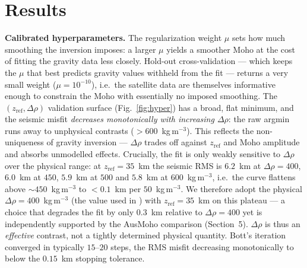 \documentclass[extra,mreferee]{gji}
\begin{document}
\section{Results}
\textbf{Calibrated hyperparameters.} The regularization weight $\mu$ sets how much
smoothing the inversion imposes: a larger $\mu$ yields a smoother Moho at the cost
of fitting the gravity data less closely. Hold-out cross-validation --- which keeps
the $\mu$ that best predicts gravity values withheld from the fit --- returns a very
small weight ($\mu=10^{-10}$), i.e.\ the satellite data are themselves informative
enough to constrain the Moho with essentially no imposed smoothing. The
$(z_{\mathrm{ref}},\Delta\rho)$ validation
surface (Fig.~\ref{fig:hyper}) has a broad, flat minimum, and the seismic misfit
\emph{decreases monotonically with increasing $\Delta\rho$}: the raw argmin runs
away to unphysical contrasts ($>600$~kg\,m$^{-3}$). This reflects the
non-uniqueness of gravity inversion --- $\Delta\rho$ trades off against
$z_{\mathrm{ref}}$ and Moho amplitude and absorbs unmodelled effects. Crucially,
the fit is only weakly sensitive to $\Delta\rho$ over the physical range: at
$z_{\mathrm{ref}}=35$~km the seismic RMS is $6.2$~km at $\Delta\rho=400$,
$6.0$~km at $450$, $5.9$~km at $500$ and $5.8$~km at $600$~kg\,m$^{-3}$, i.e.\ the
curve flattens above $\sim450$~kg\,m$^{-3}$ to $<0.1$~km per $50$~kg\,m$^{-3}$. We
therefore adopt the physical $\Delta\rho=400$~kg\,m$^{-3}$ (the value used
in \citealt{uieda2017}) with $z_{\mathrm{ref}}=35$~km on this plateau --- a choice
that degrades the fit by only $0.3$~km relative to $\Delta\rho=400$ yet is
independently supported by the {AusMoho} comparison (Section~5). $\Delta\rho$ is
thus an \emph{effective} contrast, not a tightly determined physical quantity.
Bott's iteration converged in typically $15$--$20$ steps, the RMS misfit decreasing
monotonically to below the $0.15$~km stopping tolerance.
\end{document}
